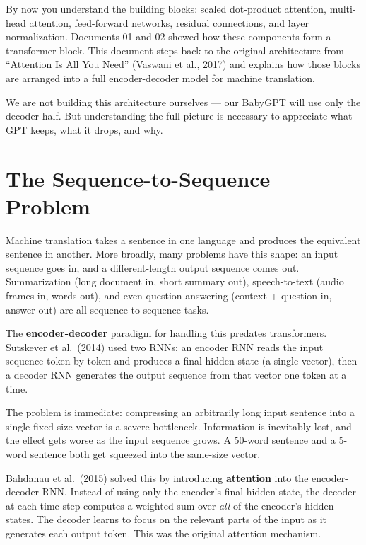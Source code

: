 


By now you understand the building blocks: scaled dot-product attention, multi-head attention, feed-forward networks, residual connections, and layer normalization. Documents 01 and 02 showed how these components form a transformer block. This document steps back to the original architecture from ``Attention Is All You Need'' (Vaswani et al., 2017) and explains how those blocks are arranged into a full encoder-decoder model for machine translation.

We are not building this architecture ourselves --- our BabyGPT will use only the decoder half. But understanding the full picture is necessary to appreciate what GPT keeps, what it drops, and why.

\section{The Sequence-to-Sequence Problem}

Machine translation takes a sentence in one language and produces the equivalent sentence in another. More broadly, many problems have this shape: an input sequence goes in, and a different-length output sequence comes out. Summarization (long document in, short summary out), speech-to-text (audio frames in, words out), and even question answering (context + question in, answer out) are all sequence-to-sequence tasks.

The \textbf{encoder-decoder} paradigm for handling this predates transformers. Sutskever et al.\ (2014) used two RNNs: an encoder RNN reads the input sequence token by token and produces a final hidden state (a single vector), then a decoder RNN generates the output sequence from that vector one token at a time.

The problem is immediate: compressing an arbitrarily long input sentence into a single fixed-size vector is a severe bottleneck. Information is inevitably lost, and the effect gets worse as the input sequence grows. A 50-word sentence and a 5-word sentence both get squeezed into the same-size vector.

Bahdanau et al.\ (2015) solved this by introducing \textbf{attention} into the encoder-decoder RNN. Instead of using only the encoder's final hidden state, the decoder at each time step computes a weighted sum over \textit{all} of the encoder's hidden states. The decoder learns to focus on the relevant parts of the input as it generates each output token. This was the original attention mechanism.

